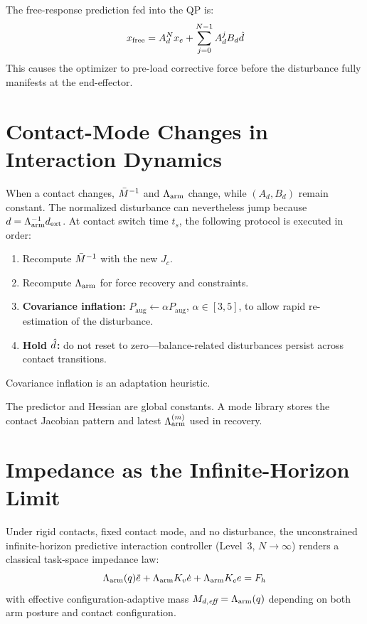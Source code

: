 The free-response prediction fed into the QP is:
\begin{equation}\label{eq:freeresponse}
  x_{\text{free}} = A_d^N x_e + \sum_{j=0}^{N-1}A_d^j B_d\hat{d}
\end{equation}
This causes the optimizer to pre-load corrective force before the
disturbance fully manifests at the end-effector.

\section{Contact-Mode Changes in Interaction Dynamics}\label{sec:switching}

When a contact changes, $\bar{M}^{-1}$ and $\Lambda_{\text{arm}}$ change, while $(A_d,B_d)$ remain
constant. The normalized disturbance can nevertheless jump because
$d=\Lambda_{\text{arm}}^{-1}d_{\rm ext}$.
At contact switch time $t_s$, the following protocol is executed in order:
\begin{enumerate}
  \item Recompute $\bar{M}^{-1}$ with the new $J_c$.
  \item Recompute $\Lambda_{\text{arm}}$ for force recovery and constraints.
  \item \textbf{Covariance inflation:} $P_{\text{aug}}\leftarrow\alpha P_{\text{aug}}$,
        $\alpha\in[3,5]$, to allow rapid re-estimation of the disturbance.
  \item \textbf{Hold $\hat{d}$:} do not reset to zero---balance-related
        disturbances persist across contact transitions.
\end{enumerate}
Covariance inflation is an adaptation heuristic.

The predictor and Hessian are global constants. A mode library stores the
contact Jacobian pattern and latest $\Lambda_{\text{arm}}^{(m)}$ used in recovery.

\section{Impedance as the Infinite-Horizon Limit}\label{sec:theorem}

\begin{theorem}\label{thm:equivalence}
Under rigid contacts, fixed contact mode, and no disturbance, the
unconstrained infinite-horizon predictive interaction controller (Level~3, $N\to\infty$)
renders a classical task-space impedance law:
\begin{equation}\label{eq:impedance}
  \Lambda_{\text{arm}}(q)\ddot{e}+\Lambda_{\text{arm}} K_v\dot{e}+\Lambda_{\text{arm}} K_e e = F_h
\end{equation}
with effective configuration-adaptive mass $M_{d,\emph{eff}}=\Lambda_{\text{arm}}(q)$
depending on both arm posture and contact configuration.
\end{theorem}

